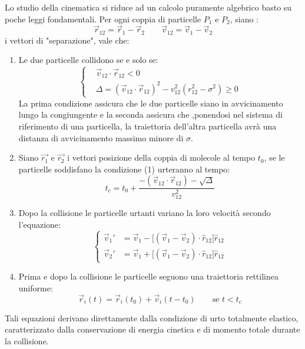 \documentclass[11pt]{article}
\theoremstyle{plain}
\theoremstyle{remark}
\begin{document}
Lo studio della cinematica si riduce ad un calcolo puramente algebrico basto su poche leggi fondamentali. Per ogni coppia di particelle $P_1$ e $P_2$, siano :
\begin{displaymath}
\vec{r}_{12} = \vec{r}_1 - \vec{r}_2 \qquad \vec{v}_{12} = \vec{v}_1 - \vec{v}_2
\end{displaymath}
i vettori di "separazione", vale che:

\begin{enumerate}
\item Le due particelle  collidono se e solo se:
\begin{equation}\begin{cases}\label{eq: condizioneurto}
 & \vec{v}_{12}\cdot \vec{r}_{12} < 0\\
 & \Delta = (\vec{v}_{12}\cdot \vec{r}_{12})^2 - v_{12}^2(r_{12}^2 -\sigma^2) \geq 0
\end{cases}\end{equation}
La prima condizione assicura che le due particelle siano in avvicinamento lungo la congiungente e la seconda assicura che ,ponendosi nel sistema di riferimento di una particella, la traiettoria dell'altra particella avrà una distanza di avvicinamento massimo minore di $\sigma$. 

\item Siano $\vec{r_1}$ e $\vec{r_2}$ i vettori posizione della coppia di molecole al tempo $t_0$, se le particelle soddisfano la condizione (1) urteranno al tempo:
\begin{equation}\label{eq: tempocollisione}
 t_c = t_0 + \dfrac{-(\vec{v}_{12}\cdot \vec{r}_{12}) - \sqrt{\Delta} }{v_{12}^2}
\end{equation}


\item Dopo la collisione le particelle urtanti variano la loro velocità secondo l'equazione:
\begin{equation}\begin{cases}\label{eq: cambiovel}
 \vec{v}_{1}' & = \vec{v}_{1} - \big[ (\vec{v}_{1} - \vec{v}_{2})\cdot \hat{r}_{12} \big] \hat{r}_{12}\\
 \vec{v}_{2}' & = \vec{v}_{1} + \big[ (\vec{v}_{1} - \vec{v}_{2})\cdot \hat{r}_{12} \big] \hat{r}_{12}
\end{cases}\end{equation}
 
 
\item Prima e dopo la collisione le particelle seguono una traiettoria rettilinea uniforme:
\begin{equation}
\vec{r}_i(t) = \vec{r}_i(t_0) + \vec{v}_i(t - t_0) \qquad \textrm{se } t<t_c
\end{equation} 
\end{enumerate}
Tali equazioni derivano direttamente dalla condizione di urto totalmente elastico, caratterizzato dalla conservazione di energia cinetica e di momento totale durante la collisione.
\end{document}

